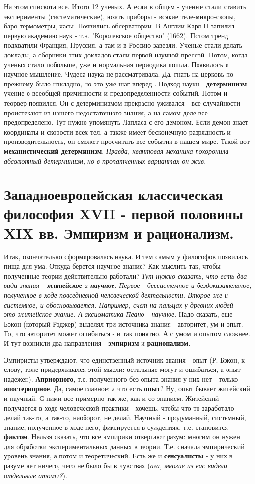 На этом спискота все. Итого 12 ученых. А если в общем - ученые стали ставить эксперименты (систематические), юзать приборы - всякие теле-микро-скопы, баро-термометры, часы. Появились обсерватории. В Англии Карл II запилил первую академию наук - т.н. "Королевское общество" (1662). Потом тренд подхватили Франция, Пруссия, а там и в Россию завезли. Ученые стали делать доклады, а сборники этих докладов стали первой научной прессой. Потом, когда ученых стало побольше, уже и нормальная периодика пошла. Появилось и научное мышление. Чудеса наука не рассматривала. Да, гнать на церковь по-прежнему было накладно, но это уже шаг вперед . Подход науки - \textbf{детерминизм} - учение о всеобщей причинности и предопределенности событий. Потом и теорвер появился. Он с детерминизмом прекрасно уживался - все случайности проистекают из нашего недостаточного знания, а на самом деле все предопределено. Тут нужно упомянуть Лапласа с его демоном. Если демон знает координаты и скорости всех тел, а также имеет бесконечную разрядность и производительность, он сможет просчитать все события в нашем мире. Такой вот \textbf{механистический детерминизм}. \textit{Правда, квантовая механика похоронила абсолютный детерминизм, но в пропатченных вариантах он жив}.

\section{Западноевропейская классическая философия XVII - первой половины XIX вв. Эмпиризм и рационализм.}
Итак, окончательно сформировалась наука. И тем самым у философов появилась пища для ума. Откуда берется научное знание? Как мыслить так, чтобы полученные теории действительно работали? \textit{Тут нужно сказать, что есть два вида знания - \textbf{житейское} и \textbf{научное}. Первое - бессистемное и бездоказательное, полученное в ходе повседневной человеческой деятельности. Второе же и системное, и обосновывается. Например, счет на пальцах у древних людей - это житейское знание. А аксиоматика Пеано - научное}. Надо сказать, еще Бэкон (который Роджер) выделял три источника знания - авторитет, ум и опыт. То, что авторитет может ошибаться - и так понятно. А с умом и опытом сложнее. И тут возникли два направления - \textbf{эмпиризм} и \textbf{рационализм}.

Эмпиристы утверждают, что единственный источник знания - опыт (Р. Бэкон, к слову, тоже придерживался этой мысли: остальные могут и ошибаться, а опыт надежен). \textbf{Априорного}, т.е. полученного без опыта знания у них нет - только  \textbf{апостериорное}. Да, самое главное: а что есть \textbf{опыт}? Ну, опыт бывает житейский и научный. С ними все примерно так же, как и со знанием. Житейский получается в ходе человеческой практики - хочешь, чтобы что-то заработало - делай так-то, а так-то, наоборот, не делай. Научный - продуманный, системный, знание, полученное в ходе него, фиксируется в суждениях, т.е. становится \textbf{фактом}. Нельзя сказать, что все эмпирики отвергают разум: многим он нужен для обработки экспериментальных данных в теории. Т.е. сначала эмпирический уровень знания, а потом и теоретический. Есть же и \textbf{сенсуалисты} - у них в разуме нет ничего, чего не было бы в чувствах (\textit{ага, многие из вас видели отдельные атомы?}).

